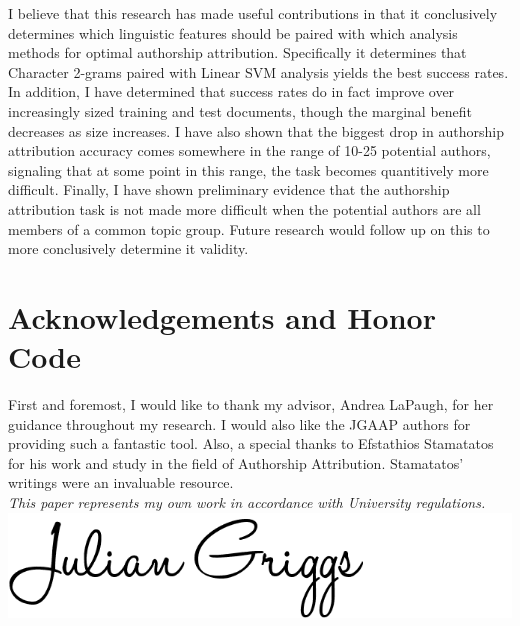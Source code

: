 \documentclass[pageno]{jpaper}
\begin{document}

I believe that this research has made useful contributions in that it conclusively determines which linguistic features should be paired with which analysis methods for optimal authorship attribution.  Specifically it determines that Character 2-grams paired with Linear SVM analysis yields the best success rates.  In addition, I have determined that success rates do in fact improve over increasingly sized training and test documents, though the marginal benefit decreases as size increases.  I have also shown that the biggest drop in authorship attribution accuracy comes somewhere in the range of 10-25 potential authors, signaling that at some point in this range, the task becomes quantitively more difficult.  Finally, I have shown preliminary evidence that the authorship attribution task is not made more difficult when the potential authors are all members of a common topic group.  Future research would follow up on this to more conclusively determine it validity.
\section{Acknowledgements and Honor Code}
\label{sec:acknowledgements}
First and foremost, I would like to thank my advisor, Andrea LaPaugh, for her guidance throughout my research.
I would also like the JGAAP authors for providing such a fantastic tool.
Also, a special thanks to Efstathios Stamatatos for his work and study in the field of Authorship Attribution.  Stamatatos' writings were an invaluable resource.
\\
\textit{This paper represents my own work in accordance with University regulations.}
\\
\includegraphics[scale=0.25]{signature}


\end{document}
